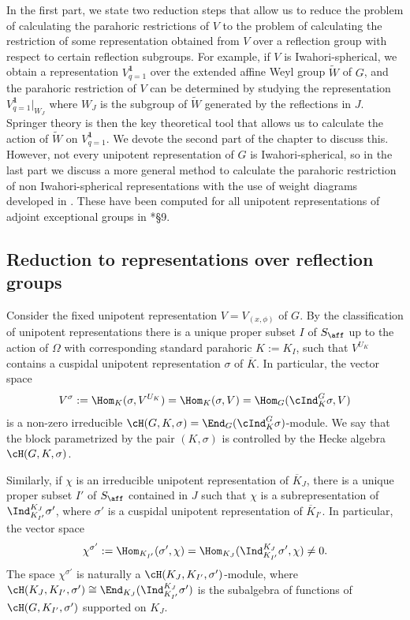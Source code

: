 In the first part, we state two reduction steps that allow us to reduce the problem of calculating the parahoric restrictions of $V$ to the problem of calculating the restriction of some representation obtained from $V$ over a reflection group with respect to certain reflection subgroups. For example, if $V$ is Iwahori-spherical, we obtain a representation $V^{\mathbf{1}}_{q=1}$ over the extended affine Weyl group $\widetilde{W}$ of $G$, and the parahoric restriction of $V$ can be determined by studying the representation $V^{\mathbf{1}}_{q=1}|_{W_J}$ where $W_J$ is the subgroup of $\widetilde{W}$ generated by the reflections in $J$. Springer theory is then the key theoretical tool that allows us to calculate the action of $\widetilde{W}$ on $V^{\mathbf{1}}_{q=1}$. We devote the second part of the chapter to discuss this. However, not every unipotent representation of $G$ is Iwahori-spherical, so in the last part we discuss a more general method to calculate the parahoric restriction of non Iwahori-spherical representations with the use of weight diagrams developed in \cite{Reeder1997}. These have been computed for all unipotent representations of adjoint exceptional groups in \cite{Reeder2000}*{\S 9}.

\subsection{Reduction to representations over reflection groups}

Consider the fixed unipotent representation $V=V_{(x,\phi)}$ of $G$. By the classification of unipotent representations there is a unique proper subset $I$ of $S_{\aff}$ up to the action of $\Omega$ with corresponding standard parahoric $K:=K_I$, such that $V^{U_K}$ contains a cuspidal unipotent representation $\sigma$ of $\overline{K}$. In particular, the vector space 
\begin{equation}\label{eqn:Vsigma}
    V^\sigma:=\Hom_K(\sigma,V^{U_K})=\Hom_K(\sigma,V)=\Hom_G(\cInd_K^G\sigma,V)    
\end{equation}
is a non-zero irreducible $\cH(G,K,\sigma)=\End_G(\cInd_K^G\sigma)$-module. We say that the block parametrized by the pair $(K,\sigma)$ is controlled by the Hecke algebra $\cH(G,K,\sigma)$. 

Similarly, if $\chi$ is an irreducible unipotent representation of $\overline{K}_J$, there is a unique proper subset $I'$ of $S_{\aff}$ contained in $J$ such that $\chi$ is a subrepresentation of $\Ind_{K_{I'}}^{K_J}\sigma'$, where $\sigma'$ is a cuspidal unipotent representation of $\overline{K}_{I'}$. In particular, the vector space
$$\chi^{\sigma'}:=\Hom_{K_{I'}}(\sigma',\chi)=\Hom_{K_J}(\Ind_{K_{I'}}^{K_J}\sigma',\chi)\neq0.$$
The space $\chi^{\sigma'}$ is naturally a $\cH(K_J,K_{I'},\sigma')$-module, where $\cH(K_J,K_{I'},\sigma')\cong\End_{K_J}(\Ind_{K_{I'}}^{K_J}\sigma')$ is the subalgebra of functions of $\cH(G,K_{I'},\sigma')$ supported on $K_J$.


